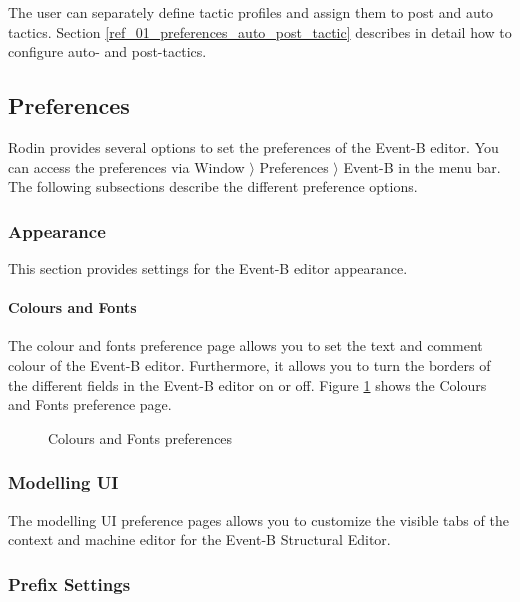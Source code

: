 The user can separately define tactic profiles and assign them to post and auto tactics.  Section \ref{ref_01_preferences_auto_post_tactic} describes in detail how to configure auto- and post-tactics. 

\subsection{Preferences}
\label{preferences}

Rodin provides several options to set the preferences of the Event-B editor. You can access the preferences via \textsf{Window $\rangle$ Preferences $\rangle$ Event-B} in the menu bar. The following subsections describe the different preference options.

\subsubsection{Appearance}

This section provides settings for the Event-B editor appearance.

\paragraph{Colours and Fonts}

The colour and fonts preference page allows you to set the text and comment colour of the Event-B editor. Furthermore, it allows you to turn  the borders of the different fields in the Event-B editor on or off. Figure \ref{fig_ref_01_preferences13} shows the Colours and Fonts preference page.

\begin{figure}[!ht]
\begin{center}
	\caption{Colours and Fonts preferences}
	\label{fig_ref_01_preferences13}
\end{center}
\end{figure}

\subsubsection{Modelling UI}

The modelling UI preference pages allows you to customize the visible tabs of the context and machine editor for the Event-B Structural Editor.

\subsubsection{Prefix Settings}

